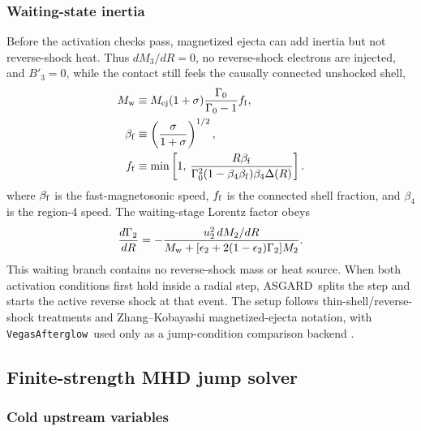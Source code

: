 \documentclass[twocolumn]{aastex702}
\newcommand{\asgard}{\textsc{ASGARD}}
\newcommand{\vegas}{\texttt{VegasAfterglow}}
\begin{document}
\subsubsection{Waiting-state inertia}

Before the activation checks pass, magnetized ejecta can add inertia but not
reverse-shock heat.  Thus \(dM_3/dR=0\), no reverse-shock electrons are injected,
and \(B'_3=0\), while the contact still feels the causally connected unshocked
shell,
\begin{equation}
\begin{aligned}
M_{\rm w}&\equiv
M_{\rm ej}(1+\sigma)\frac{\Gamma_0}{\Gamma_0-1}f_{\rm f},\\
\beta_{\rm f}&\equiv \left(\frac{\sigma}{1+\sigma}\right)^{1/2},\\
f_{\rm f}&\equiv \min\left[
1,\,
\frac{R\beta_{\rm f}}
{\Gamma_0^2(1-\beta_4\beta_{\rm f})\beta_4\Delta(R)}
\right].
\end{aligned}
\end{equation}
where \(\beta_{\rm f}\) is the fast-magnetosonic speed, \(f_{\rm f}\) is the
connected shell fraction, and \(\beta_4\) is the region-4 speed.  The
waiting-stage Lorentz factor obeys
\begin{equation}
\frac{d\Gamma_2}{dR}
=-\frac{u_2^2\,dM_2/dR}
{M_{\rm w}+[\epsilon_2+2(1-\epsilon_2)\Gamma_2]M_2}.
\end{equation}
This waiting branch contains no reverse-shock mass or heat source.  When both
activation conditions first hold inside a radial step, \asgard\ splits the step
and starts the active reverse shock at that event.  The setup follows
thin-shell/reverse-shock treatments and Zhang--Kobayashi magnetized-ejecta
notation, with \vegas\ used only as a jump-condition comparison backend
\citep{SariPiran1999,Kobayashi2000,ZhangKobayashi2005,PeerWijers2006,Giannios2008,Wang2025VegasAfterglow}.

\subsection{Finite-strength MHD jump solver}

\subsubsection{Cold upstream variables}
\end{document}
